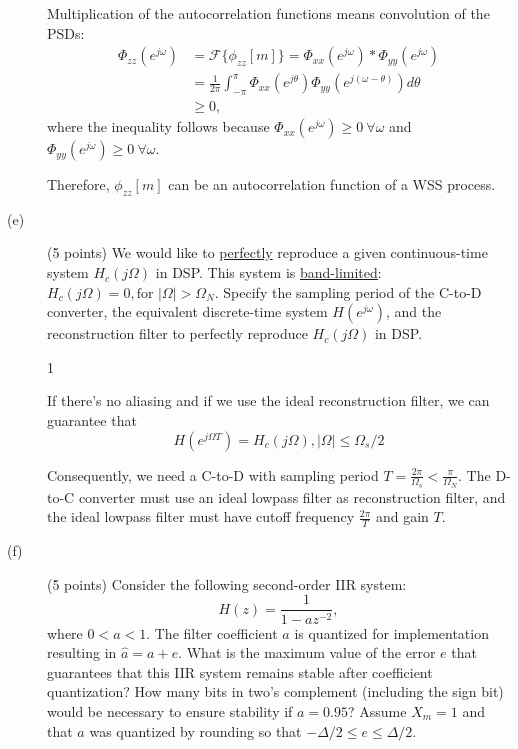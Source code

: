 \documentclass[10pt]{article}
\def\SOLUTIONS{0} %
\def\SolutionsColor{red2}
\begin{document}
\begin{description}
{Multiplication of the autocorrelation functions means convolution of the PSDs:
\begin{align*}
  \Phi_{zz}(e^{j\omega}) &= \mathcal{F}\{\phi_{zz}[m]\} = \Phi_{xx}(e^{j\omega}) \ast \Phi_{yy}(e^{j\omega}) \\
  &= \frac{1}{2\pi}\int_{-\pi}^\pi \Phi_{xx}(e^{j\theta})\Phi_{yy}(e^{j(\omega-\theta)})d\theta \\
  &\geq 0,
\end{align*}
where the inequality follows because $\Phi_{xx}(e^{j\omega}) \geq 0~\forall\omega$ and $\Phi_{yy}(e^{j\omega}) \geq 0~\forall\omega$.

Therefore, $\phi_{zz}[m]$ can be an autocorrelation function of a WSS process.
}
\else\vspace{7cm}
\fi

%
\item[(e)] (5 points) We would like to \underline{perfectly} reproduce a given continuous-time system $H_c(j\Omega)$ in DSP. This system is \underline{band-limited}: $H_c(j\Omega) = 0, \text{for } |\Omega| > \Omega_N$. Specify the sampling period of the C-to-D converter, the equivalent discrete-time system $H(e^{j\omega})$, and the reconstruction filter to perfectly reproduce $H_c(j\Omega)$ in DSP.

\if\SOLUTIONS1
{\color{\SolutionsColor} 
If there's no aliasing and if we use the ideal reconstruction filter, we can guarantee that
\begin{equation}
H(e^{j\Omega T}) = H_c(j\Omega), |\Omega| \leq \Omega_s/2
\end{equation}

Consequently, we need a C-to-D with sampling period $T = \frac{2\pi}{\Omega_s} < \frac{\pi}{\Omega_N}$. The D-to-C converter must use an ideal lowpass filter as reconstruction filter, and the ideal lowpass filter must have cutoff frequency $\frac{2\pi}{T}$ and gain $T$.

}
\else\vspace{4cm}
\fi


%
\item[(f)] (5 points) Consider the following second-order IIR system:
\begin{equation}
H(z) = \frac{1}{1 - az^{-2}},
\end{equation}
where $0 < a < 1$. The filter coefficient $a$ is quantized for implementation resulting in $\hat{a} = a + e$. What is the maximum value of the error $e$ that guarantees that this IIR system remains stable after coefficient quantization? How many bits in two's complement (including the sign bit) would be necessary to ensure stability if $a = 0.95$? Assume $X_m = 1$ and that $a$ was quantized by rounding so that $-\Delta/2\leq e\leq \Delta/2$.


\end{description}
\end{document}
